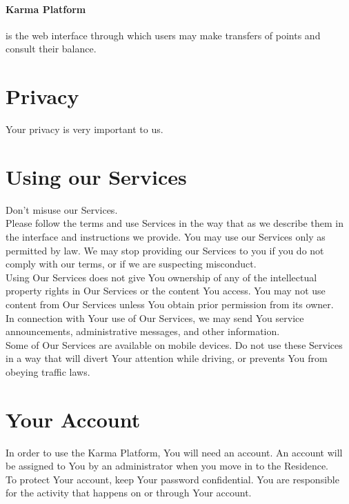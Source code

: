 \documentclass[12pt,a4paper]{article}
\begin{document}
\paragraph{Karma Platform}

is the web interface through which users may make transfers of points and consult their balance. 

\section{Privacy}

Your privacy is very important to us. 

\section{Using our Services}

Don't misuse our Services. \\

Please follow the terms and use Services in the way that as we describe them in the interface and instructions we provide. You may use our Services only as permitted by law. We may stop providing our Services to you if you do not comply with our terms, or if we are suspecting misconduct.\\

Using Our Services does not give You ownership of any of the intellectual property rights in Our Services or the content You access. You may not use content from Our Services unless You obtain prior permission from its owner. \\

In connection with Your use of Our Services, we may send You service announcements, administrative messages, and other information. \\

Some of Our Services are available on mobile devices. Do not use these Services in a way that will divert Your attention while driving, or prevents You from obeying traffic laws.

\section{Your Account}

In order to use the Karma Platform, You will need an account. An account will be assigned to You by an administrator when you move in to the Residence. \\

To protect Your account, keep Your password confidential. You are responsible for the activity that happens on or through Your account.
\end{document}
